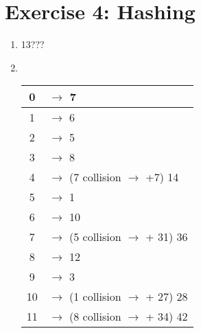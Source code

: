 \documentclass{gadsescript}
\begin{document}
\section*{Exercise 4: Hashing}
\begin{enumerate}[label=\alph*)]
	\item 13???
	\item~\\
		\begin{tabular}{c|l}
			0 & $\rightarrow$ 7\\\hline
			1 & $\rightarrow$ 6\\\hline
			2 & $\rightarrow$ 5\\\hline
			3 & $\rightarrow$ 8\\\hline
			4 & $\rightarrow$ (7 collision $\rightarrow$ +7) 14\\\hline
			5 & $\rightarrow$ 1\\\hline
			6 & $\rightarrow$ 10\\\hline
			7 & $\rightarrow$ (5 collision $\rightarrow$ + 31) 36\\\hline
			8 & $\rightarrow$ 12\\\hline
			9 & $\rightarrow$ 3\\\hline
			10 & $\rightarrow$ (1 collision $\rightarrow$ + 27) 28\\\hline
			11 & $\rightarrow$ (8 collision $\rightarrow$ + 34) 42\\
		\end{tabular}
\end{enumerate}
\end{document}
